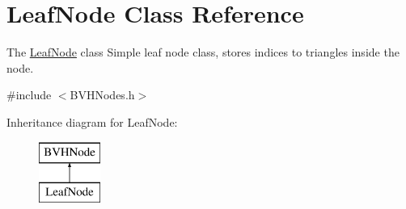 \hypertarget{classLeafNode}{\section{Leaf\-Node Class Reference}
\label{classLeafNode}
}


The \hyperlink{classLeafNode}{Leaf\-Node} class Simple leaf node class, stores indices to triangles inside the node.  




{\ttfamily \#include $<$B\-V\-H\-Nodes.\-h$>$}

Inheritance diagram for Leaf\-Node\-:\begin{figure}[H]
\begin{center}
\leavevmode
\includegraphics[height=2.000000cm]{classLeafNode}
\end{center}
\end{figure}
